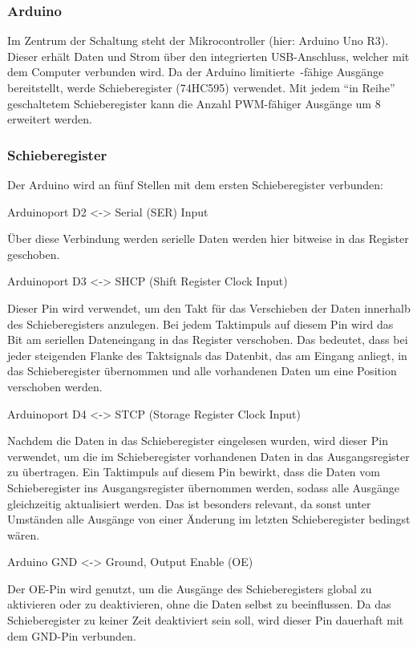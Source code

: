 \subsubsection{Arduino}

Im Zentrum der Schaltung steht der Mikrocontroller (hier: Arduino Uno R3).
Dieser erhält Daten und Strom über den integrierten USB-Anschluss, welcher mit dem Computer verbunden wird.
Da der Arduino limitierte~-fähige Ausgänge bereitstellt, werde Schieberegister (74HC595) verwendet.
Mit jedem \enquote{in Reihe} geschaltetem Schieberegister kann die Anzahl PWM-fähiger Ausgänge um 8 erweitert werden.

\subsubsection{Schieberegister}

Der Arduino wird an fünf Stellen mit dem ersten Schieberegister verbunden:

Arduinoport D2 <-> Serial (SER) Input

Über diese Verbindung werden serielle Daten werden hier bitweise in das Register geschoben.

Arduinoport D3 <-> SHCP (Shift Register Clock Input)

Dieser Pin wird verwendet, um den Takt für das Verschieben der Daten innerhalb des Schieberegisters anzulegen.
Bei jedem Taktimpuls auf diesem Pin wird das Bit am seriellen Dateneingang in das Register verschoben.
Das bedeutet, dass bei jeder steigenden Flanke des Taktsignals das Datenbit, das am Eingang anliegt, in das Schieberegister übernommen und alle vorhandenen Daten um eine Position verschoben werden.

Arduinoport D4 <-> STCP (Storage Register Clock Input)

Nachdem die Daten in das Schieberegister eingelesen wurden, wird dieser Pin verwendet, um die im Schieberegister vorhandenen Daten in das Ausgangsregister zu übertragen.
Ein Taktimpuls auf diesem Pin bewirkt, dass die Daten vom Schieberegister ins Ausgangsregister übernommen werden, sodass alle Ausgänge gleichzeitig aktualisiert werden.
Das ist besonders relevant, da sonst unter Umständen alle Ausgänge von einer Änderung im letzten Schieberegister bedingst wären.

Arduino GND <-> Ground, Output Enable (OE)

Der OE-Pin wird genutzt, um die Ausgänge des Schieberegisters global zu aktivieren oder zu deaktivieren, ohne die Daten selbst zu beeinflussen.
Da das Schieberegister zu keiner Zeit deaktiviert sein soll, wird dieser Pin dauerhaft mit dem GND-Pin verbunden.

